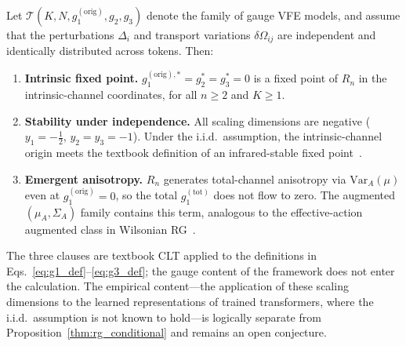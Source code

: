 \documentclass[twoside,11pt]{article}
\begin{document}
\begin{proposition}
\label{thm:rg_conditional}
Let $\mathcal{T}(K, N, g_1^{(\mathrm{orig})}, g_2, g_3)$ denote the family of gauge VFE models, and assume that the perturbations $\Delta_i$ and transport variations $\delta\Omega_{ij}$ are independent and identically distributed across tokens. Then:
\begin{enumerate}
\item[(i)] \textbf{Intrinsic fixed point.} $g_1^{(\mathrm{orig}),*} = g_2^* = g_3^* = 0$ is a fixed point of $R_n$ in the intrinsic-channel coordinates, for all $n \geq 2$ and $K \geq 1$.
\item[(ii)] \textbf{Stability under independence.} All scaling dimensions are negative ($y_1 = -\tfrac{1}{2}$, $y_2 = y_3 = -1$). Under the i.i.d.\ assumption, the intrinsic-channel origin meets the textbook definition of an infrared-stable fixed point~\citep{Cardy1996,goldenfeld1992lectures}.
\item[(iii)] \textbf{Emergent anisotropy.} $R_n$ generates total-channel anisotropy via $\mathrm{Var}_A(\mu)$ even at $g_1^{(\mathrm{orig})} = 0$, so the total $g_1^{(\mathrm{tot})}$ does not flow to zero. The augmented $(\mu_A, \Sigma_A)$ family contains this term, analogous to the effective-action augmented class in Wilsonian RG~\citep{Cardy1996}.
\end{enumerate}
\end{proposition}

The three clauses are textbook CLT applied to the definitions in Eqs.~\eqref{eq:g1_def}--\eqref{eq:g3_def}; the gauge content of the framework does not enter the calculation. The empirical content---the application of these scaling dimensions to the learned representations of trained transformers, where the i.i.d.\ assumption is not known to hold---is logically separate from Proposition~\ref{thm:rg_conditional} and remains an open conjecture.
\end{document}

